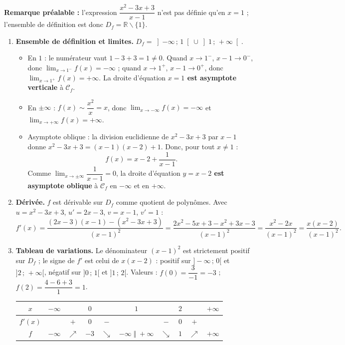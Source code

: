 \documentclass[11pt]{article}
\def\setminus{\mathbin{\backslash}}\let\smallsetminus\setminus
\begin{document}
\begin{corrige}
\textbf{Remarque préalable :} l'expression $\dfrac{x^2-3x+3}{x-1}$ n'est pas définie qu'en $x=1$ ; l'ensemble de définition est donc $D_f=\mathbb{R}\setminus\{1\}$.

\begin{enumerate}
    \item \textbf{Ensemble de définition et limites.} $D_f=\left]-\infty\,;\,1\right[\cup\left]1\,;\,+\infty\right[$.
    \begin{itemize}
        \item En $1$ : le numérateur vaut $1-3+3=1\neq 0$. Quand $x\to 1^-$, $x-1\to 0^-$, donc $\lim_{x\to 1^-}f(x)=-\infty$ ; quand $x\to 1^+$, $x-1\to 0^+$, donc $\lim_{x\to 1^+}f(x)=+\infty$. La droite d'équation \textbf{$x=1$ est asymptote verticale} à $\mathcal{C}_f$.
        \item En $\pm\infty$ : $f(x)\sim \dfrac{x^2}{x}=x$, donc $\lim_{x\to -\infty}f(x)=-\infty$ et $\lim_{x\to +\infty}f(x)=+\infty$.
        \item Asymptote oblique : la division euclidienne de $x^2-3x+3$ par $x-1$ donne $x^2-3x+3=(x-1)(x-2)+1$. Donc, pour tout $x\neq 1$ :
        \[
        f(x)=x-2+\frac{1}{x-1}.
        \]
        Comme $\lim_{x\to\pm\infty}\dfrac{1}{x-1}=0$, la droite d'équation \textbf{$y=x-2$ est asymptote oblique} à $\mathcal{C}_f$ en $-\infty$ et en $+\infty$.
    \end{itemize}
    \item \textbf{Dérivée.} $f$ est dérivable sur $D_f$ comme quotient de polynômes. Avec $u=x^2-3x+3$, $u'=2x-3$, $v=x-1$, $v'=1$ :
    \[
    f'(x)=\frac{(2x-3)(x-1)-(x^2-3x+3)}{(x-1)^2}=\frac{2x^2-5x+3-x^2+3x-3}{(x-1)^2}=\frac{x^2-2x}{(x-1)^2}=\frac{x(x-2)}{(x-1)^2}.
    \]
    \item \textbf{Tableau de variations.} Le dénominateur $(x-1)^2$ est strictement positif sur $D_f$ ; le signe de $f'$ est celui de $x(x-2)$ : positif sur $]-\infty\,;\,0[$ et $]2\,;\,+\infty[$, négatif sur $]0\,;\,1[$ et $]1\,;\,2[$. Valeurs : $f(0)=\dfrac{3}{-1}=-3$ ; $f(2)=\dfrac{4-6+3}{1}=1$.
    \begin{center}
    \begin{tabular}{|c|ccccccccc|}\hline
    $x$ & $-\infty$ & & $0$ & & $1$ & & $2$ & & $+\infty$ \\ \hline
    $f'(x)$ & & $+$ & $0$ & $-$ & & $-$ & $0$ & $+$ & \\ \hline
    $f$ & $-\infty$ & $\nearrow$ & $-3$ & $\searrow$ & $-\infty \;\Vert\; +\infty$ & $\searrow$ & $1$ & $\nearrow$ & $+\infty$ \\ \hline

\end{tabular}
\end{center}
\end{enumerate}
\end{corrige}
\end{document}
